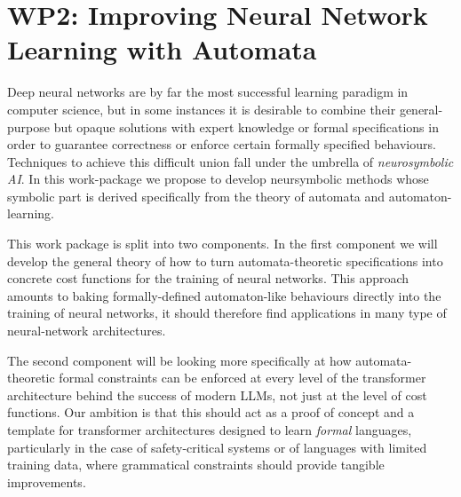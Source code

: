 \documentclass[11pt,a4paper]{article}
\begin{document}
		
	\section*{WP2: Improving Neural Network Learning with Automata}
		Deep neural networks are by far the most successful learning paradigm in computer science, but in some instances it is desirable to combine their general-purpose but opaque solutions with expert knowledge or formal specifications in order to guarantee correctness or enforce certain formally specified behaviours. Techniques to achieve this difficult union fall under the umbrella of \emph{neurosymbolic AI}. In this work-package we propose to develop neursymbolic methods whose symbolic part is derived specifically from the theory of automata and automaton-learning.
		
		This work package is split into two components. In the first component we will develop the general theory of how to turn automata-theoretic specifications into concrete cost functions for the training of neural networks. This approach amounts to baking formally-defined automaton-like behaviours directly into the training of neural networks, it should therefore find applications in many type of neural-network architectures.
		
		The second component  will be looking more specifically at how automata-theoretic formal constraints can be enforced at every level of the transformer architecture behind the success of modern LLMs, not just at the level of  cost functions. Our ambition is that this should act as a proof of concept and a template for transformer architectures designed to learn \emph{formal} languages, particularly in the case of safety-critical systems or of languages with limited training data, where grammatical constraints should provide tangible improvements.
	
		\setcounter{section}{2}
		\setcounter{subsection}{0}
\end{document}

